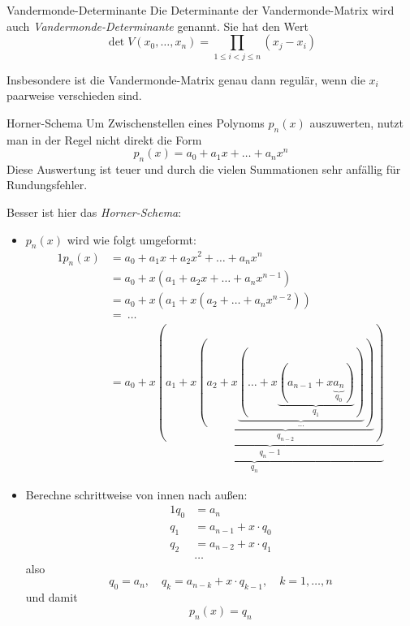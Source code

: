 \begin{defi}{Vandermonde-Determinante}
    Die Determinante der Vandermonde-Matrix wird auch \emph{Vandermonde-Determinante} genannt.
    Sie hat den Wert 
    \[
        \det V(x_0, \ldots, x_n) = \prod_{1 \leq i < j \leq n} (x_j - x_i) 
    \]

    Insbesondere ist die Vandermonde-Matrix genau dann regulär, wenn die $x_i$ paarweise verschieden sind. 
\end{defi}

\begin{defi}{Horner-Schema}
    Um Zwischenstellen eines Polynoms $p_n(x)$ auszuwerten, nutzt man in der Regel nicht direkt die Form 
    \[
        p_n(x) = a_0 + a_1 x + \ldots + a_n x^n    
    \]
    Diese Auswertung ist teuer und durch die vielen Summationen sehr anfällig für Rundungsfehler.

    Besser ist hier das \emph{Horner-Schema}: 
    \begin{itemize}
        \item $p_n(x)$ wird wie folgt umgeformt: 
        \begin{alignat*}{1}
            p_n (x) & = a_0 + a_1 x + a_2 x^2 + \ldots + a_n x^n \\ 
            & = a_0 + x \left( a_1 + a_2 x + \ldots + a_n x^{n-1} \right) \\ 
            & = a_0 + x \left( a_1 + x \left( a_2 + \ldots + a_n x^{n-2} \right) \right) \\ 
            & = \ \ldots \\ 
            & = \underbrace{a_0 + x \underbrace{( a_1 + x \underbrace{( a_2 + x \underbrace{( \ldots + x \underbrace{( a_{n-1} + x \underbrace{a_n}_{q_0} )}_{q_1} )}_{\ldots} )}_{q_{n-2}} )}_{q_n-1}}_{q_n}
        \end{alignat*}
        \item Berechne schrittweise von innen nach außen: 
        \begin{alignat*}{1}
            q_0 & = a_n \\ 
            q_1 & = a_{n-1} + x \cdot q_0 \\
            q_2 & = a_{n-2} + x \cdot q_1 \\
            & \ldots
        \end{alignat*}
        also
        \[ 
            q_0 = a_n, \quad q_k = a_{n-k} + x \cdot q_{k-1}, \quad k = 1, \ldots, n
        \] 
        und damit 
        \[ 
            p_n(x) = q_n
        \] 
    \end{itemize}
\end{defi}

